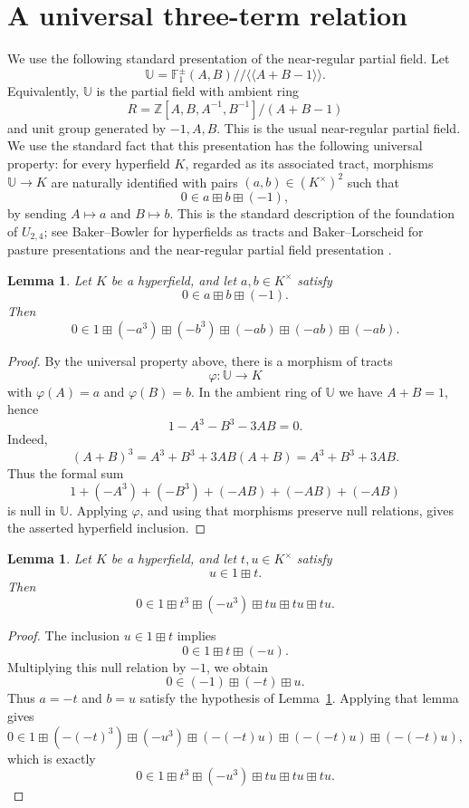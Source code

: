 \documentclass[11pt]{article}
\newtheorem{lemma}[theorem]{Lemma}
\theoremstyle{remark}
\begin{document}
\section{A universal three-term relation}

We use the following standard presentation of the near-regular partial field.
Let
\[
\mathbb U
=
\mathbb F_{1}^{\pm}(A,B)\big/\!\!\big/\langle\!\langle A+B-1\rangle\!\rangle .
\]
Equivalently, \(\mathbb U\) is the partial field with ambient ring
\[
R=\mathbb Z[A,B,A^{-1},B^{-1}]/(A+B-1)
\]
and unit group generated by \(-1,A,B\). This is the usual near-regular partial
field. We use the standard fact that this presentation has the following universal
property: for every hyperfield \(K\), regarded as its associated tract, morphisms
\(\mathbb U\to K\) are naturally identified with pairs \((a,b)\in (K^\times)^2\)
such that
\[
0\in a\boxplus b\boxplus(-1),
\]
by sending \(A\mapsto a\) and \(B\mapsto b\). This is the standard description of
the foundation of \(U_{2,4}\); see Baker--Bowler for hyperfields as tracts
\cite{BB19} and Baker--Lorscheid for pasture presentations and the near-regular
partial field presentation \cite[Appendix A and Example 3.3]{BL24}.

\begin{lemma}\label{lem:nearregular}
Let \(K\) be a hyperfield, and let \(a,b\in K^\times\) satisfy
\[
0\in a\boxplus b\boxplus(-1).
\]
Then
\[
0\in
1\boxplus(-a^3)\boxplus(-b^3)
\boxplus(-ab)\boxplus(-ab)\boxplus(-ab).
\]
\end{lemma}

\begin{proof}
By the universal property above, there is a morphism of tracts
\[
\varphi:\mathbb U\longrightarrow K
\]
with \(\varphi(A)=a\) and \(\varphi(B)=b\). In the ambient ring of \(\mathbb U\) we
have \(A+B=1\), hence
\[
1-A^3-B^3-3AB=0.
\]
Indeed,
\[
(A+B)^3=A^3+B^3+3AB(A+B)=A^3+B^3+3AB.
\]
Thus the formal sum
\[
1+(-A^3)+(-B^3)+(-AB)+(-AB)+(-AB)
\]
is null in \(\mathbb U\). Applying \(\varphi\), and using that morphisms preserve
null relations, gives the asserted hyperfield inclusion.
\end{proof}

\begin{lemma}\label{lem:normalized}
Let \(K\) be a hyperfield, and let \(t,u\in K^\times\) satisfy
\[
u\in 1\boxplus t.
\]
Then
\[
0\in
1\boxplus t^3\boxplus(-u^3)
\boxplus tu\boxplus tu\boxplus tu.
\]
\end{lemma}

\begin{proof}
The inclusion \(u\in 1\boxplus t\) implies
\[
0\in 1\boxplus t\boxplus(-u).
\]
Multiplying this null relation by \(-1\), we obtain
\[
0\in (-1)\boxplus(-t)\boxplus u.
\]
Thus \(a=-t\) and \(b=u\) satisfy the hypothesis of Lemma~\ref{lem:nearregular}.
Applying that lemma gives
\[
0\in
1\boxplus(-(-t)^3)\boxplus(-u^3)
\boxplus(-(-t)u)\boxplus(-(-t)u)\boxplus(-(-t)u),
\]
which is exactly
\[
0\in
1\boxplus t^3\boxplus(-u^3)
\boxplus tu\boxplus tu\boxplus tu.
\]
\end{proof}
\end{document}
